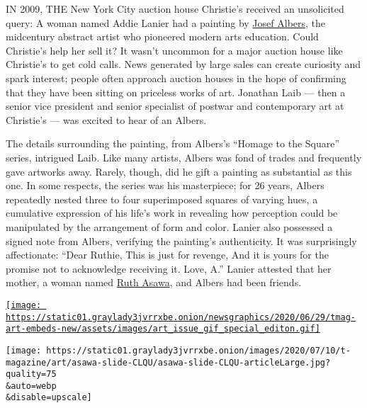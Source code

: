 IN 2009, THE New York City auction house Christie's received an
unsolicited query: A woman named Addie Lanier had a painting by
\href{https://www.nytimes3xbfgragh.onion/1976/03/26/archives/josef-albers-artist-and-teacher-dies.html}{Josef
Albers}, the midcentury abstract artist who pioneered modern arts
education. Could Christie's help her sell it? It wasn't uncommon for a
major auction house like Christie's to get cold calls. News generated by
large sales can create curiosity and spark interest; people often
approach auction houses in the hope of confirming that they have been
sitting on priceless works of art. Jonathan Laib --- then a senior vice
president and senior specialist of postwar and contemporary art at
Christie's --- was excited to hear of an Albers.

The details surrounding the painting, from Albers's ``Homage to the
Square'' series, intrigued Laib. Like many artists, Albers was fond of
trades and frequently gave artworks away. Rarely, though, did he gift a
painting as substantial as this one. In some respects, the series was
his masterpiece; for 26 years, Albers repeatedly nested three to four
superimposed squares of varying hues, a cumulative expression of his
life's work in revealing how perception could be manipulated by the
arrangement of form and color. Lanier also possessed a signed note from
Albers, verifying the painting's authenticity. It was surprisingly
affectionate: ``Dear Ruthie, This is just for revenge, And it is yours
for the promise not to acknowledge receiving it. Love, A.'' Lanier
attested that her mother, a woman named
\href{https://www.nytimes3xbfgragh.onion/news/the-lives-they-lived/2013/12/21/ruth-asawa/}{Ruth
Asawa}, and Albers had been friends.

\href{https://www.nytimes3xbfgragh.onion/issue/t-magazine/2020/07/02/true-believers-art-issue}{\texttt{[image: https://static01.graylady3jvrrxbe.onion/newsgraphics/2020/06/29/tmag-art-embeds-new/assets/images/art\_issue\_gif\_special\_editon.gif]}}

\texttt{[image: https://static01.graylady3jvrrxbe.onion/images/2020/07/10/t-magazine/art/asawa-slide-CLQU/asawa-slide-CLQU-articleLarge.jpg?quality=75\\\&auto=webp\\\&disable=upscale]}

